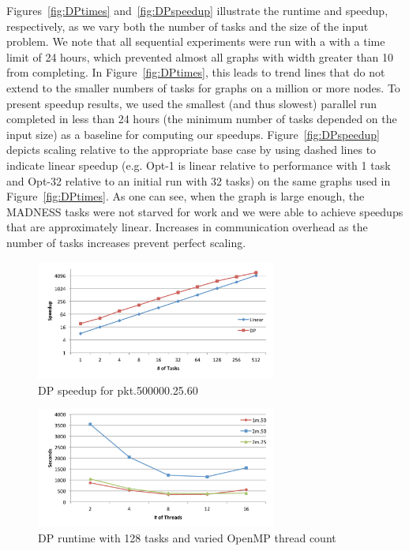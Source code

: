 \documentclass[conference]{IEEEtran}
\begin{document}
Figures~\ref{fig:DPtimes} and~\ref{fig:DPspeedup} illustrate the runtime and speedup, respectively, as we vary both the number of tasks and the size of the input problem. We note that all sequential experiments were run with a
with a time limit of 24 hours, which prevented almost all graphs with width greater than 10 from completing. In Figure~\ref{fig:DPtimes}, this leads to trend lines that do not extend to the smaller numbers of tasks for graphs on a
million or more nodes.  To present speedup results, we used the smallest (and thus slowest) parallel run completed in less than 24 hours (the minimum number of tasks depended on the input size) as a baseline for computing our speedups. Figure~\ref{fig:DPspeedup} depicts scaling relative to the appropriate base case by using dashed lines to indicate linear speedup (e.g. Opt-1 is linear relative to performance with 1 task and Opt-32 relative to an initial run with 32 tasks) on the same graphs used in Figure~\ref{fig:DPtimes}. As one can see, when the graph is large enough, the MADNESS tasks were not starved for work and we were able to achieve speedups that are approximately linear.  Increases in communication overhead as the number of tasks increases prevent perfect scaling.

\begin{figure}[!ht]
\includegraphics[angle=0,width=3.1in]{figures/fig11_col.pdf}
\caption{DP speedup for pkt.500000.25.60}
\label{fig:500k.25.seq.sp}
\end{figure}

\begin{figure}[!ht]
\includegraphics[angle=0,width=3.1in]{figures/fig12_col.pdf}
\caption{DP runtime with 128 tasks and varied OpenMP thread count}
\label{fig:thread_scale}
\end{figure}
\end{document}
